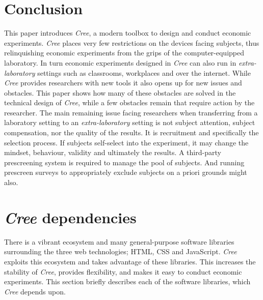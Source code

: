 \documentclass[preprint, 12pt]{elsarticle}
\newcommand{\Cree}{\emph{Cree}\xspace}
\begin{document}


\section{Conclusion}
\label{S:Conclusion}

This paper introduces \Cree, a modern toolbox to design and conduct economic experiments. \Cree places very few restrictions on the devices facing subjects, thus relinquishing economic experiments from the grips of the computer-equipped laboratory. In turn economic experiments designed in \Cree can also run in \emph{extra-laboratory} settings such as classrooms, workplaces and over the internet. While \Cree provides researchers with new tools it also opens up for new issues and obstacles. This paper shows how many of these obstacles are solved in the technical design of \Cree, while a few obstacles remain that require action by the researcher. The main remaining issue facing researchers when transferring from a laboratory setting to an \emph{extra-laboratory} setting is not subject attention, subject compensation, nor the quality of the results. It is recruitment and specifically the selection process. If subjects self-select into the experiment, it may change the mindset, behaviour, validity and ultimately the results. A third-party prescreening system is required to manage the pool of subjects. And running prescreen surveys to appropriately exclude subjects on a priori grounds might also. %

\newpage

\appendix

\section{\Cree dependencies}
\label{S:dependencies}

There is a vibrant ecosystem and many general-purpose software libraries surrounding the three web technologies; HTML, CSS and JavaScript. \Cree exploits this ecosystem and takes advantage of these libraries. This increases the stability of \Cree, provides flexibility, and makes it easy to conduct economic experiments. This section briefly describes each of the software libraries, which \Cree depends upon.
\end{document}
